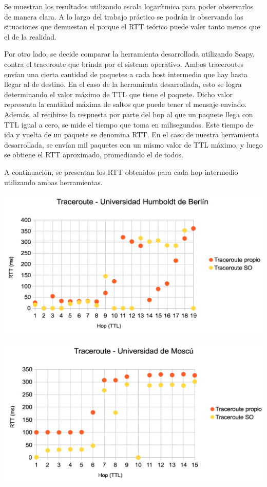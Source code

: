 Se muestran los resultados utilizando escala logarítmica para poder observarlos de manera clara. A lo largo del trabajo práctico se podrán ir observando las situaciones que demuestan el porque el RTT teórico puede valer tanto menos que el de la realidad.

Por otro lado, se decide comparar la herramienta desarrollada utilizando Scapy, contra el traceroute que brinda por el sistema operativo. Ambos traceroutes envían una cierta cantidad de paquetes a cada host intermedio que hay hasta llegar al de destino. En el 
caso de la herramienta desarrollada, esto se logra determinando el valor máximo de TTL que tiene el paquete. Dicho valor representa la cantidad máxima de saltos que puede tener el mensaje enviado. Además, al recibirse la respuesta por parte del hop al que un paquete llega con TTL igual a cero, se mide el tiempo que toma en milisegundos. Este tiempo de ida y vuelta de un paquete se denomina RTT. En el caso de nuestra herramienta desarrollada, se envían mil paquetes con un mismo valor de TTL máximo, y luego se obtiene el RTT aproximado, promediando el de todos. 

A continuación, se presentan los RTT obtenidos para cada hop intermedio utilizando ambas herramientas. 

\centerline{\includegraphics[width=1\textwidth]{imagenes/1ra_parte/Alemania_1ergrafico.png}}

\centerline{\includegraphics[width=1\textwidth]{imagenes/1ra_parte/Rusia_1ergrafico.png}}

